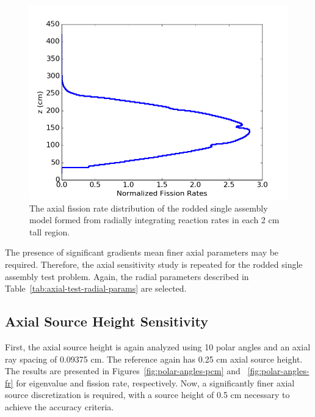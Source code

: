 \begin{figure}[h!]
	\centering
	\includegraphics[width=0.7\linewidth]{figures/results/rr-plots/single-assembly-rodded-axial.png}
	\caption[]{The axial fission rate distribution of the rodded single assembly model formed from radially integrating reaction rates in each 2 cm tall region.}
	\label{fig:single-assembly-rodded-axial}
\end{figure}

The presence of significant gradients mean finer axial parameters may be required. Therefore, the axial sensitivity study is repeated for the rodded single assembly test problem. Again, the radial parameters described in Table~\ref{tab:axial-test-radial-params} are selected.

\subsection{Axial Source Height Sensitivity}

First, the axial source height is again analyzed using 10 polar angles and an axial ray spacing of 0.09375 cm. The reference again has 0.25 cm axial source height. The results are presented in Figures~\ref{fig:polar-angles-pcm} and ~\ref{fig:polar-angles-fr} for eigenvalue and fission rate, respectively. Now, a significantly finer axial source discretization is required, with a source height of 0.5 cm necessary to achieve the accuracy criteria.

